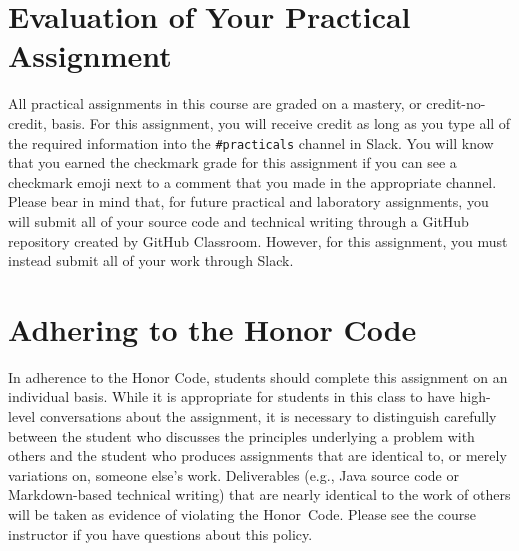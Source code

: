 \documentclass[11pt]{article}
\newcommand{\url}[1]{\lstinline{#1}}
\begin{document}
\vspace*{-.1in}

\section*{Evaluation of Your Practical Assignment}

All practical assignments in this course are graded on a mastery, or
credit-no-credit, basis. For this assignment, you will receive credit as long as
you type all of the required information into the \url{#practicals} channel in
Slack. You will know that you earned the checkmark grade for this assignment if
you can see a checkmark emoji next to a comment that you made in the appropriate
channel. Please bear in mind that, for future practical and laboratory
assignments, you will submit all of your source code and technical writing
through a GitHub repository created by GitHub Classroom. However, for this
assignment, you must instead submit all of your work through Slack.

\section*{Adhering to the Honor Code}

In adherence to the Honor Code, students should complete this assignment on an
individual basis. While it is appropriate for students in this class to have
high-level conversations about the assignment, it is necessary to distinguish
carefully between the student who discusses the principles underlying a problem
with others and the student who produces assignments that are identical to, or
merely variations on, someone else's work. Deliverables (e.g., Java source code
or Markdown-based technical writing) that are nearly identical to the work of
others will be taken as evidence of violating the \mbox{Honor Code}. Please see
the course instructor if you have questions about this policy.
\end{document}
